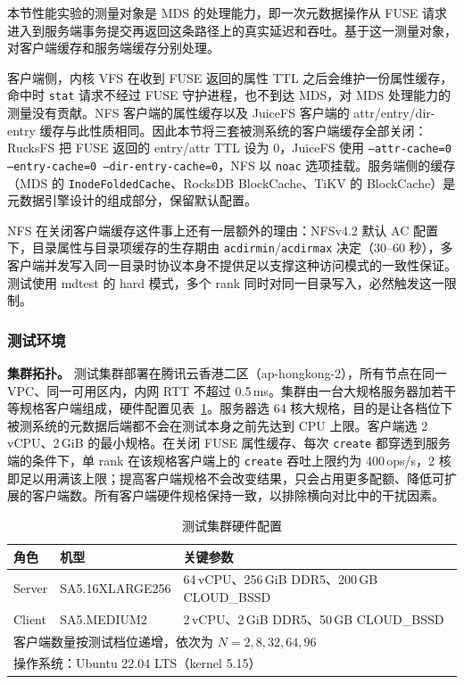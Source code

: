 本节性能实验的测量对象是 MDS 的处理能力，即一次元数据操作从 FUSE 请求进入到服务端事务提交再返回这条路径上的真实延迟和吞吐。基于这一测量对象，对客户端缓存和服务端缓存分别处理。

客户端侧，内核 VFS 在收到 FUSE 返回的属性 TTL 之后会维护一份属性缓存，命中时 \texttt{stat} 请求不经过 FUSE 守护进程，也不到达 MDS，对 MDS 处理能力的测量没有贡献。NFS 客户端的属性缓存以及 JuiceFS 客户端的 attr/entry/dir-entry 缓存与此性质相同。因此本节将三套被测系统的客户端缓存全部关闭：RucksFS 把 FUSE 返回的 entry/attr TTL 设为 0，JuiceFS 使用 \texttt{--attr-cache=0 --entry-cache=0 --dir-entry-cache=0}，NFS 以 \texttt{noac} 选项挂载。服务端侧的缓存（MDS 的 \texttt{InodeFoldedCache}、RocksDB BlockCache、TiKV 的 BlockCache）是元数据引擎设计的组成部分，保留默认配置。

NFS 在关闭客户端缓存这件事上还有一层额外的理由：NFSv4.2 默认 AC 配置下，目录属性与目录项缓存的生存期由 \texttt{acdirmin}/\texttt{acdirmax} 决定（30--60 秒），多客户端并发写入同一目录时协议本身不提供足以支撑这种访问模式的一致性保证。测试使用 mdtest 的 hard 模式，多个 rank 同时对同一目录写入，必然触发这一限制。

\subsubsection{测试环境}
\label{sec:expr-env}

\textbf{集群拓扑。} 测试集群部署在腾讯云香港二区（ap-hongkong-2），所有节点在同一 VPC、同一可用区内，内网 RTT 不超过 0.5\,ms。集群由一台大规格服务器加若干等规格客户端组成，硬件配置见表~\ref{tab:hw-env-v2}。服务器选 64 核大规格，目的是让各档位下被测系统的元数据后端都不会在测试本身之前先达到 CPU 上限。客户端选 2\,vCPU、2\,GiB 的最小规格。在关闭 FUSE 属性缓存、每次 \texttt{create} 都穿透到服务端的条件下，单 rank 在该规格客户端上的 \texttt{create} 吞吐上限约为 400\,ops/s，2 核即足以用满该上限；提高客户端规格不会改变结果，只会占用更多配额、降低可扩展的客户端数。所有客户端硬件规格保持一致，以排除横向对比中的干扰因素。

\begin{table}[htbp]
    \centering
    \caption{测试集群硬件配置}
    \label{tab:hw-env-v2}
    \small
    \begin{tabular}{lll}
        \toprule
        角色 & 机型 & 关键参数 \\
        \midrule
        Server  & SA5.16XLARGE256 & 64\,vCPU、256\,GiB DDR5、200\,GB CLOUD\_BSSD \\
        Client  & SA5.MEDIUM2     & 2\,vCPU、2\,GiB DDR5、50\,GB CLOUD\_BSSD \\
        \midrule
        \multicolumn{3}{l}{客户端数量按测试档位递增，依次为 $N=2,8,32,64,96$} \\
        \multicolumn{3}{l}{操作系统：Ubuntu 22.04 LTS（kernel 5.15）} \\
        \bottomrule
    \end{tabular}
\end{table}


